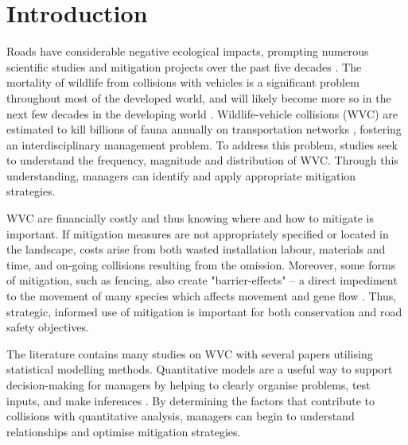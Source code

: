 \section{Introduction}

Roads have considerable negative ecological impacts, prompting numerous scientific studies and mitigation projects over the past five decades \citep{form98,spel98,rvdr15}. The mortality of wildlife from collisions with vehicles is a significant problem throughout most of the developed world, and will likely become more so in the next few decades in the developing world \citep{rvdr15}. Wildlife-vehicle collisions (WVC) are estimated to kill billions of fauna annually on transportation networks \citep{seil06}, fostering an interdisciplinary management problem. To address this problem, studies seek to understand the frequency, magnitude and distribution of WVC.  Through this understanding, managers can identify and apply appropriate mitigation strategies.

WVC are financially costly \citep{biss08b,huij09,rowd08} and thus knowing where and how to mitigate is important.  If mitigation measures are not appropriately specified or located in the landscape, costs arise from both wasted installation labour, materials and time, and on-going collisions resulting from the omission.  Moreover, some forms of mitigation, such as fencing, also create "barrier-effects" -- a direct impediment to the movement of many species which affects movement and gene flow \citep{epps05}.  Thus, strategic, informed use of mitigation is important for both conservation and road safety objectives.

The literature contains many studies on WVC with several papers utilising statistical modelling methods.  Quantitative models are a useful way to support decision-making for managers by helping to clearly organise problems, test inputs, and make inferences \citep{ande15}.  By determining the factors that contribute to collisions with quantitative analysis, managers can begin to understand relationships and optimise mitigation strategies.

